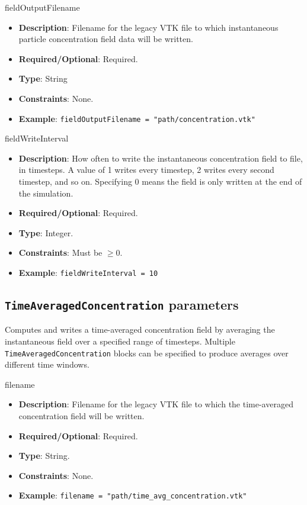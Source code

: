 fieldOutputFilename
\vspace{\the\parameterListSpacing}
\begin{itemize}
    \item {\bf Description}: Filename for the legacy VTK file to which instantaneous particle concentration field data will be written.
    \item {\bf Required/Optional}: Required.
    \item {\bf Type}: String
    \item {\bf Constraints}: None.
    \item {\bf Example}: \lstinline!fieldOutputFilename = "path/concentration.vtk"!
\end{itemize}

fieldWriteInterval
\vspace{\the\parameterListSpacing}
\begin{itemize}
    \item {\bf Description}: How often to write the instantaneous concentration field to file, in timesteps. A value of 1 writes every timestep, 2 writes every second timestep, and so on. Specifying 0 means the field is only written at the end of the simulation.
    \item {\bf Required/Optional}: Required.
    \item {\bf Type}: Integer.
    \item {\bf Constraints}: Must be $\geq 0$.
    \item {\bf Example}: \lstinline!fieldWriteInterval = 10!
\end{itemize}


\subsection*{\lstinline!TimeAveragedConcentration! parameters}
Computes and writes a time-averaged concentration field by averaging the instantaneous field over a specified range of timesteps. Multiple \lstinline!TimeAveragedConcentration! blocks can be specified to produce averages over different time windows.

filename
\vspace{\the\parameterListSpacing}
\begin{itemize}
    \item {\bf Description}: Filename for the legacy VTK file to which the time-averaged concentration field will be written.
    \item {\bf Required/Optional}: Required.
    \item {\bf Type}: String.
    \item {\bf Constraints}: None.
    \item {\bf Example}: \lstinline!filename = "path/time_avg_concentration.vtk"!
\end{itemize}


